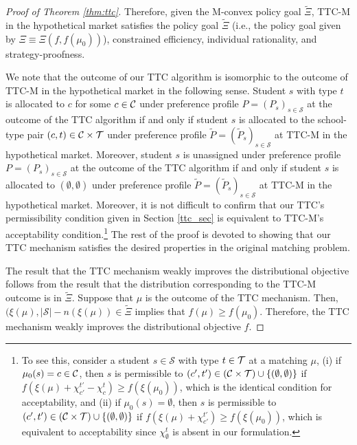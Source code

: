 \documentclass[12pt]{amsart}
\theoremstyle{remark}
\def\S{\mathcal{S}} \def\cals{\mathcal{S}}
\begin{document}
\begin{proof}[Proof of Theorem \ref{thm:ttc}]
\begin{comment}
\end{comment}

Therefore, given the M-convex policy goal $\tilde{\Xi}$, TTC-M in the hypothetical market satisfies the policy goal $\tilde \Xi$ (i.e., the policy goal given by $\Xi \equiv \Xi(f,f(\mu_0))$), constrained efficiency, individual rationality, and strategy-proofness.

We note that the outcome of our TTC algorithm is isomorphic to the outcome of TTC-M in the hypothetical market in the following sense. Student $s$ with type $t$ is allocated to $c$ for some $c \in \mathcal{C}$ under preference profile $P=(P_s)_{s \in \S}$ at the outcome of the TTC algorithm if and only if student $s$ is allocated to the school-type pair $(c,t) \in \mathcal{C} \times \mathcal{T}$ under preference profile $\tilde P=(\tilde P_s)_{s \in \S}$ at TTC-M in the hypothetical market. Moreover, student $s$ is unassigned under preference profile $P=(P_s)_{s \in \S}$ at the outcome of the TTC algorithm if and only if student $s$ is allocated to $(\emptyset,\emptyset)$ under preference profile $\tilde P=(\tilde P_s)_{s \in \S}$ at TTC-M in the hypothetical market. Moreover, it is not difficult to confirm that our TTC's permissibility condition given in Section \ref{ttc_sec} is equivalent to TTC-M's acceptability condition.\footnote{To see this, consider a student $s\in \cals$ with type $t\in \mathcal{T}$ at a matching $\mu$, (i) if $\mu_0(s)=c\in \mathcal{C}$, then $s$ is permissible to $(c',t') \in \left(\mathcal{C} \times \mathcal{T}\right) \cup \{(\emptyset,\emptyset)\}$ if $f(\xi(\mu)+\chi_{c'}^{t'}-\chi_c^t) \geq f(\xi(\mu_0))$, which is the identical condition for acceptability, and (ii) if $\mu_0(s)=\emptyset$, then $s$ is permissible to $(c',t')\in \left(\mathcal{C} \times \mathcal{T}\right) \cup \{(\emptyset,\emptyset)\}$ if $f(\xi(\mu)+\chi_{c'}^{t'}) \geq f(\xi(\mu_0))$, which is equivalent to acceptability since $\chi_{\emptyset}^t$ is absent in our formulation.} The rest of the proof is devoted to showing that our TTC mechanism satisfies the desired properties in the original matching problem.

The result that the TTC mechanism weakly improves the distributional objective follows from the result
that the distribution corresponding to the TTC-M outcome is in  $\tilde{\Xi}$. Suppose that $\mu$ is the outcome of the TTC mechanism. Then, $(\xi(\mu),|\mathcal S|- n(\xi(\mu)) \in  \tilde{\Xi}$
 implies that $f(\mu) \ge f(\mu_0)$. Therefore, the TTC mechanism weakly improves the
distributional objective $f$.


\end{proof}
\end{document}
